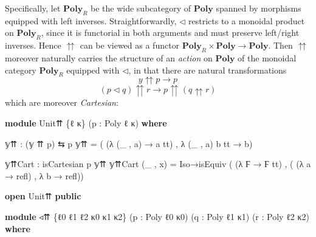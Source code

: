 \documentclass[
  11pt,
  oneside,
  article]{memoir}
\newenvironment{Shaded}{}{}
\newcommand{\KeywordTok}[1]{\textcolor[rgb]{0.00,0.44,0.13}{\textbf{#1}}}
\newcommand{\NormalTok}[1]{#1}
\newcommand{\OtherTok}[1]{\textcolor[rgb]{0.00,0.44,0.13}{#1}}
\theoremstyle{definition}
\theoremstyle{plain}
\newcommand{\Cat}[1]{\mathbf{#1}}%
\newcommand{\poly}{\Cat{Poly}}
\newcommand{\0}{\textsf{0}}
\newcommand{\1}{\tn{\textsf{1}}}
\begin{document}
Specifically, let \(\poly_{R}\) be the wide subcategory of
\(\poly\) spanned by morphisms equipped with left inverses.
Straightforwardly, \(\triangleleft\) restricts to a monoidal product on
\(\poly_R\), since it is functorial in both arguments and must
preserve left/right inverses. Hence \(\upuparrows\) can be viewed as a
functor \(\poly_R \times \poly \to \poly\). Then
\(\upuparrows\) moreover naturally carries the structure of an
\emph{action} on \(\poly\) of the monoidal category
\(\poly_R\) equipped with \(\triangleleft\), in that there are
natural transformations \[
y \upuparrows p \to p \] \[
(p \triangleleft q) \upuparrows r \to p \upuparrows (q \upuparrows r)
\] which are moreover \emph{Cartesian}:

\begin{Shaded}
\begin{Highlighting}[]
\KeywordTok{module}\NormalTok{ Unit⇈ }\OtherTok{\{}\NormalTok{ℓ κ}\OtherTok{\}} \OtherTok{(}\NormalTok{p }\OtherTok{:}\NormalTok{ Poly ℓ κ}\OtherTok{)} \KeywordTok{where}

\NormalTok{    𝕪⇈ }\OtherTok{:} \OtherTok{(}\NormalTok{𝕪 ⇈ p}\OtherTok{)}\NormalTok{ ⇆ p}
\NormalTok{    𝕪⇈ }\OtherTok{=} \OtherTok{(} \OtherTok{(λ} \OtherTok{(\_}\NormalTok{ , a}\OtherTok{)} \OtherTok{→}\NormalTok{ a tt}\OtherTok{)}\NormalTok{ , }\OtherTok{λ} \OtherTok{(\_}\NormalTok{ , a}\OtherTok{)}\NormalTok{ b tt }\OtherTok{→}\NormalTok{ b}\OtherTok{)}

\NormalTok{    𝕪⇈Cart }\OtherTok{:}\NormalTok{ isCartesian p 𝕪⇈}
\NormalTok{    𝕪⇈Cart }\OtherTok{(\_}\NormalTok{ , x}\OtherTok{)} \OtherTok{=} 
\NormalTok{        Iso→isEquiv }\OtherTok{(} \OtherTok{(λ}\NormalTok{ Ϝ }\OtherTok{→}\NormalTok{ Ϝ tt}\OtherTok{)} 
\NormalTok{                    , }\OtherTok{(} \OtherTok{(λ}\NormalTok{ a }\OtherTok{→}\NormalTok{ refl}\OtherTok{)} 
\NormalTok{                      , }\OtherTok{λ}\NormalTok{ b }\OtherTok{→}\NormalTok{ refl}\OtherTok{))}

\KeywordTok{open}\NormalTok{ Unit⇈ }\KeywordTok{public}

\KeywordTok{module}\NormalTok{ ◃⇈ }\OtherTok{\{}\NormalTok{ℓ0 ℓ1 ℓ2 κ0 κ1 κ2}\OtherTok{\}} \OtherTok{(}\NormalTok{p }\OtherTok{:}\NormalTok{ Poly ℓ0 κ0}\OtherTok{)} 
          \OtherTok{(}\NormalTok{q }\OtherTok{:}\NormalTok{ Poly ℓ1 κ1}\OtherTok{)} \OtherTok{(}\NormalTok{r }\OtherTok{:}\NormalTok{ Poly ℓ2 κ2}\OtherTok{)} \KeywordTok{where}


\end{Highlighting}
\end{Shaded}
\end{document}
